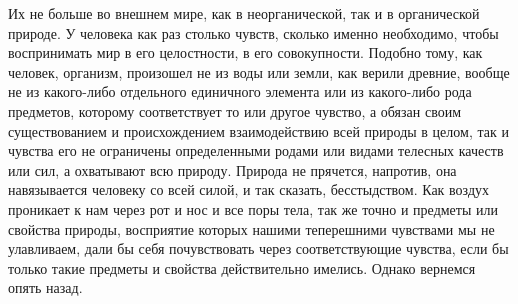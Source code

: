 \documentclass[12pt]{article}
\begin{document}
Их не больше во внешнем мире, как в неорганической, так и в органической природе. У человека как раз столько чувств, сколько именно необходимо, чтобы воспринимать мир в его целостности, в его совокупности. Подобно тому, как человек, организм, произошел не из воды или земли, как верили древние, вообще не из какого-либо отдельного единичного элемента или из какого-либо рода предметов, которому соответствует то или другое чувство, а обязан своим существованием и происхождением взаимодействию всей природы в целом, так и чувства его не ограничены определенными родами или видами телесных качеств или сил, а охватывают всю природу. Природа не прячется, напротив, она навязывается человеку со всей силой, и так сказать, бесстыдством. Как воздух проникает к нам через рот и нос и все поры тела, так же точно и предметы или свойства природы, восприятие которых нашими теперешними чувствами мы не улавливаем, дали бы себя почувствовать через соответствующие чувства, если бы только такие предметы и свойства действительно имелись. Однако вернемся опять назад. 
\end{document}
